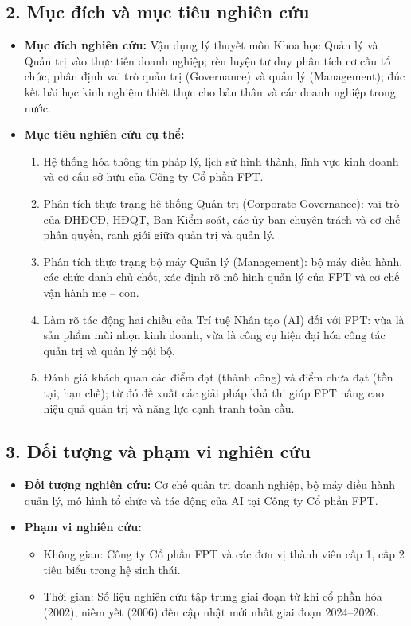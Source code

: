 \subsection*{2. Mục đích và mục tiêu nghiên cứu}
\begin{itemize}
    \item \textbf{Mục đích nghiên cứu:} Vận dụng lý thuyết môn Khoa học Quản lý và Quản trị vào thực tiễn doanh nghiệp; rèn luyện tư duy phân tích cơ cấu tổ chức, phân định vai trò quản trị (Governance) và quản lý (Management); đúc kết bài học kinh nghiệm thiết thực cho bản thân và các doanh nghiệp trong nước.
    \item \textbf{Mục tiêu nghiên cứu cụ thể:}
    \begin{enumerate}[label=\alph*)]
        \item Hệ thống hóa thông tin pháp lý, lịch sử hình thành, lĩnh vực kinh doanh và cơ cấu sở hữu của Công ty Cổ phần FPT.
        \item Phân tích thực trạng hệ thống Quản trị (Corporate Governance): vai trò của ĐHĐCĐ, HĐQT, Ban Kiểm soát, các ủy ban chuyên trách và cơ chế phân quyền, ranh giới giữa quản trị và quản lý.
        \item Phân tích thực trạng bộ máy Quản lý (Management): bộ máy điều hành, các chức danh chủ chốt, xác định rõ mô hình quản lý của FPT và cơ chế vận hành mẹ -- con.
        \item Làm rõ tác động hai chiều của Trí tuệ Nhân tạo (AI) đối với FPT: vừa là sản phẩm mũi nhọn kinh doanh, vừa là công cụ hiện đại hóa công tác quản trị và quản lý nội bộ.
        \item Đánh giá khách quan các điểm đạt (thành công) và điểm chưa đạt (tồn tại, hạn chế); từ đó đề xuất các giải pháp khả thi giúp FPT nâng cao hiệu quả quản trị và năng lực cạnh tranh toàn cầu.
    \end{enumerate}
\end{itemize}

\subsection*{3. Đối tượng và phạm vi nghiên cứu}
\begin{itemize}
    \item \textbf{Đối tượng nghiên cứu:} Cơ chế quản trị doanh nghiệp, bộ máy điều hành quản lý, mô hình tổ chức và tác động của AI tại Công ty Cổ phần FPT.
    \item \textbf{Phạm vi nghiên cứu:} 
    \begin{itemize}
        \item Không gian: Công ty Cổ phần FPT và các đơn vị thành viên cấp 1, cấp 2 tiêu biểu trong hệ sinh thái.
        \item Thời gian: Số liệu nghiên cứu tập trung giai đoạn từ khi cổ phần hóa (2002), niêm yết (2006) đến cập nhật mới nhất giai đoạn 2024--2026.
    \end{itemize}
\end{itemize}

